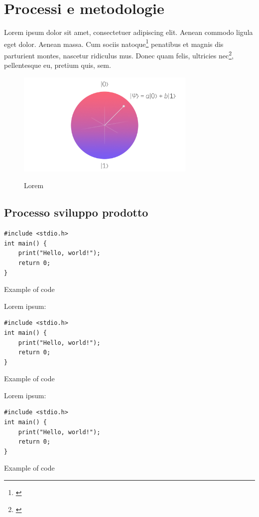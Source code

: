 \chapter{Processi e metodologie}
\label{chap:processi-metodologie}

Lorem ipsum dolor sit amet, consectetuer adipiscing elit. Aenean commodo ligula eget dolor. Aenean massa. Cum sociis natoque\footnote{\cite{site:agile-manifesto}} penatibus et magnis dis parturient montes, nascetur ridiculus mus. Donec quam felis, ultricies nec\footnote{\cite{article:spooky}}, pellentesque eu, pretium quis, sem.

\begin{figure}[H]
    \centering
    \includegraphics[alt={Testo alternativo dell'immagine}, height=5cm]{img/qubit.jpeg}
    \caption{Lorem}
    \label{fig:qubit}
\end{figure}
\lipsum[1]

\section{Processo sviluppo prodotto}
\lipsum[1-2]

\begin{listing}[H]
\begin{verbatim}
#include <stdio.h>
int main() {
    print("Hello, world!");
    return 0;
}
\end{verbatim}
\caption{Example of code}
\label{listing:b}
\end{listing}

Lorem ipsum:
\begin{listing}[H]
\begin{verbatim}
#include <stdio.h>
int main() {
    print("Hello, world!");
    return 0;
}
\end{verbatim}
\caption{Example of code}
\label{listing:b-2}
\end{listing}

Lorem ipsum:
\begin{listing}[H]
\begin{verbatim}
#include <stdio.h>
int main() {
    print("Hello, world!");
    return 0;
}
\end{verbatim}
\caption{Example of code}
\label{listing:b-3}
\end{listing}

\newpage